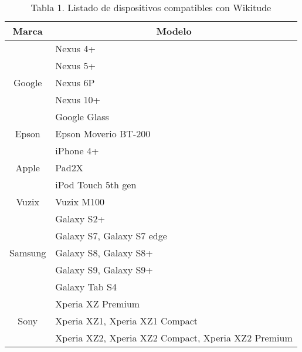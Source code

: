 \begin{table}[]
	\begin{tabular}{|c|l|}
		\hline
		\textbf{Marca}              & \multicolumn{1}{c|}{\textbf{Modelo}}               \\ \hline
		\multirow{5}{*}{Google}     & Nexus 4+                                \\ \cline{2-2} 														  
		& Nexus 5+                                           	\\ \cline{2-2} 
		& Nexus 6P                                           	\\ \cline{2-2} 
		& Nexus 10+                                          	\\ \cline{2-2} 
    	& Google Glass                                       	\\ \hline
		\multirow{1}{*}{Epson} & Epson Moverio BT-200           \\ \cline{2-2} 
		\hline
		\multirow{3}{*}{Apple}     & iPhone 4+                                \\  \cline{2-2}     														
	    & Pad2X			                                    	\\ \cline{2-2} 
		& iPod Touch 5th gen                                 	\\ \hline
		\multirow{1}{*}{Vuzix}         & Vuzix M100          	\\ \cline{2-2}
		\hline																      
		\multirow{5}{*}{Samsung} 	   & Galaxy S2+           	\\ \cline{2-2} 
		& Galaxy S7, Galaxy S7 edge                          	\\ \cline{2-2} 
		& Galaxy S8, Galaxy S8+                              	\\ \cline{2-2} 
		& Galaxy S9, Galaxy S9+                              	\\ \cline{2-2} 
		& Galaxy Tab S4                                      	\\ \hline
		\multirow{3}{*}{Sony}       & Xperia XZ Premium                                  \\ \cline{2-2} 
		& Xperia XZ1, Xperia XZ1 Compact                     \\ \cline{2-2} 
		& Xperia XZ2, Xperia XZ2 Compact, Xperia XZ2 Premium \\ \hline
	\end{tabular}
	\captionsetup{justification=centering}
	\caption*{Tabla 1. Listado de dispositivos compatibles con Wikitude}
\end{table}

